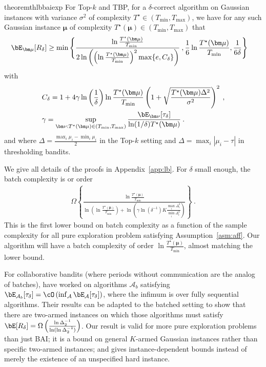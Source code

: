 \begin{restatable}[]{theorem}{thlbbaiexp}\label{th:lbbaiexp}
	For Top-$k$ and TBP, for a $\delta$-correct algorithm on Gaussian instances with variance $\sigma^2$ of complexity $T^\star\in(T_{\min},T_{\max})$, we have for any such Gaussian instance $\bm\mu$ of complexity $T^\star(\bm\mu)\in (T_{\min},T_{\max})$ that 
	\begin{align*}
	\bE_{\bm\mu}[R_\delta]
	&\ge \min\Bigg\{ \frac{\ln \frac{T^\star(\bm\mu)}{T_{\min}}}{2\ln\left( \left(\ln \frac{T^\star(\bm\mu)}{T_{\min}}\right)^2 \max\{e,C_\delta\}  \right)} \: ,\frac{1}{6}\ln \frac{T^\star(\bm\mu)}{T_{\min}},\frac{1}{6\delta}\Bigg\}
	\end{align*}
	with
	\begin{align*}
	&C_\delta = 1+4\gamma\ln\left(\frac{1}{\delta}\right)\ln \frac{T^\star(\bm\mu)}{T_{\min}}\left(1+\sqrt{\frac{T^\star(\bm\mu)\Delta^2}{\sigma^2}}\right)^2
	\: , \\
	&\gamma = \sup_{\bm\nu: T^\star(\bm\mu)\in (T_{\min},T_{\max})}\frac{\bE_{\bm\nu}[\tau_\delta]}{\ln(1/\delta)T^\star(\bm\mu)}
	\: .
	\end{align*}
	and where $\Delta = \frac{\max_i \mu_i -\min_i\mu_i}{2}$ in the Top-$k$ setting and $\Delta = \max_i |\mu_i - \tau|$ in thresholding bandits.
\end{restatable}

We give all details of the proofs in Appendix~\ref{app:lb}.
For $\delta$ small enough, the batch complexity is or order
\begin{align*}
\Omega \left\{\frac{\ln \frac{T^\star(\bm\mu)}{T_{\min}}}{\ln\left(\ln \frac{T^\star(\bm\mu)}{T_{\min}}\right) +\ln \left(\gamma \ln(\delta^{-1}) K\frac{\max_i \Delta_i^2}{\min_i \Delta_i^2}\right) }\right\}
\: .
\end{align*}
This is the first lower bound on batch complexity as a function of the sample complexity for all pure exploration problem satisfying Assumption~\ref{asm:aff}.
Our algorithm will have a batch complexity of order $\ln \frac{T^\star(\bm\mu)}{T_{\min}}$, almost matching the lower bound.

For collaborative bandits (where periods without communication are the analog of batches), \citet{taoCollaborativeLearningLimited2019} have worked on algorithms $\mathcal{A}_b$ satisfying $\bE_{\mathcal{A}_b}[\tau_\delta] =\cO\left( \inf_{\mathcal{A}}\bE_{\mathcal{A}}[\tau_\delta]\right)$, where the infimum is over fully sequential algorithms.
Their results can be adapted to the batched setting to show that there are two-armed instances on which those algorithms must satisfy $\bE[R_\delta]=\Omega\left( \frac{\ln\Delta_2^{-1}}{\ln(\ln\Delta_2^{-1})}\right)$.
Our result is valid for more pure exploration problems than just BAI; it is a bound on general $K$-armed Gaussian instances rather than specific two-armed instances; and gives instance-dependent bounds instead of merely the existence of an unspecified hard instance.

